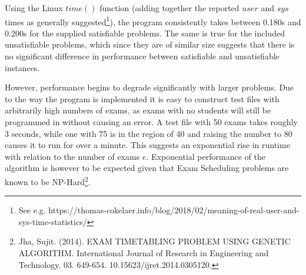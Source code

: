 \documentclass[11pt]{article}
\begin{document}
	Using the Linux \(time()\) function (adding together the reported \(user\) and \(sys\) times as generally suggested\footnote{See e.g. https://thomas-cokelaer.info/blog/2018/02/meaning-of-real-user-and-sys-time-statistics/}), the program consistently takes between 0.180s and 0.200s for the supplied satisfiable problems. The same is true for the included unsatisfiable problems, which since they are of similar size suggests that there is no significant difference in performance between satisfiable and unsatisfiable instances.

	However, performance begins to degrade significantly with larger problems. Due to the way the program is implemented it is easy to construct test files with arbitrarily high numbers of exams, as exams with no students will still be programmed in without causing an error. A test file with 50 exams takes roughly 3 seconds, while one with 75 is in the region of 40 and raising the number to 80 causes it to run for over a minute. This suggests an exponential rise in runtime with relation to the number of exams \(e\). Exponential performance of the algorithm is however to be expected given that Exam Scheduling problems are known to be NP-Hard\footnote{Jha, Sujit. (2014). EXAM TIMETABLING PROBLEM USING GENETIC ALGORITHM. International Journal of Research in Engineering and Technology. 03. 649-654. 10.15623/ijret.2014.0305120.}.
\end{document}
